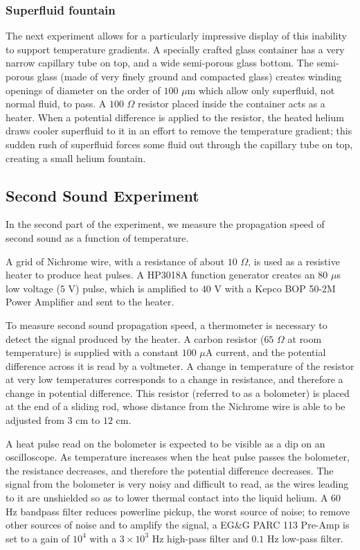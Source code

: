\subsubsection{Superfluid fountain}\label{superfluidfountain}

The next experiment allows for a particularly impressive display of this inability to support temperature gradients. A specially crafted glass container has a very narrow capillary tube on top, and a wide semi-porous glass bottom. The semi-porous glass (made of very finely ground and compacted glass) creates winding openings of diameter on the order of $100$ $\mu$m which allow only superfluid, not normal fluid, to pass. A $100$ $\Omega$ resistor placed inside the container acts as a heater. When a potential difference is applied to the resistor, the heated helium draws cooler superfluid to it in an effort to remove the temperature gradient; this sudden rush of superfluid forces some fluid out through the capillary tube on top, creating a small helium fountain.

\subsection{Second Sound Experiment}

In the second part of the experiment, we measure the propagation speed of second sound as a function of temperature.

A grid of Nichrome wire, with a resistance of about $10$ $\Omega$, is
used as a resistive heater to produce heat pulses. A HP3018A function
generator creates an $80$ $\mu$s low voltage ($5$ V) pulse, which is
amplified to $40$ V with a Kepco BOP 50-2M Power Amplifier and sent to
the heater.

To measure second sound propagation speed, a thermometer is necessary
to detect the signal produced by the heater. A carbon resistor ($65$
$\Omega$ at room temperature) is supplied with a constant $100$ $\mu$A
current, and the potential difference across it is read by a
voltmeter. A change in temperature of the resistor at very low
temperatures corresponds to a change in resistance, and therefore a
change in potential difference. This resistor (referred to as a
bolometer) is placed at the end of a sliding rod, whose distance from
the Nichrome wire is able to be adjusted from $3$ cm to $12$ cm.

A heat pulse read on the bolometer is expected to be visible as a dip
on an oscilloscope. As temperature increases when the heat pulse
passes the bolometer, the resistance decreases, and therefore the
potential difference decreases. The signal from the bolometer is very
noisy and difficult to read, as the wires leading to it are unshielded
so as to lower thermal contact into the liquid helium. A $60$ Hz
bandpass filter reduces powerline pickup, the worst source of noise;
to remove other sources of noise and to amplify the signal, a EG\&G
PARC 113 Pre-Amp is set to a gain of $10^4$ with a $3\times 10^3$ Hz
high-pass filter and $0.1$ Hz low-pass filter.

